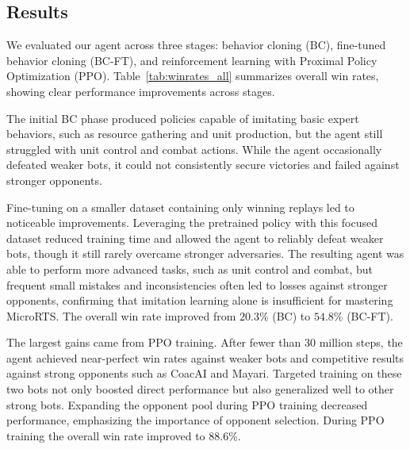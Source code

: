\documentclass[10pt,twocolumn,letterpaper]{article}
\begin{document}
\subsection{Results}

We evaluated our agent across three stages: behavior cloning (BC), fine-tuned behavior cloning (BC-FT), and reinforcement learning with Proximal Policy Optimization (PPO). Table~\ref{tab:winrates_all} summarizes overall win rates, showing clear performance improvements across stages.

The initial BC phase produced policies capable of imitating basic expert behaviors, such as resource gathering and unit production, but the agent still struggled with unit control and combat actions. While the agent occasionally defeated weaker bots, it could not consistently secure victories and failed against stronger opponents. 

Fine-tuning on a smaller dataset containing only winning replays led to noticeable improvements. Leveraging the pretrained policy with this focused dataset reduced training time and allowed the agent to reliably defeat weaker bots, though it still rarely overcame stronger adversaries. The resulting agent was able to perform more advanced tasks, such as unit control and combat, but frequent small mistakes and inconsistencies often led to losses against stronger opponents, confirming that imitation learning alone is insufficient for mastering MicroRTS. The overall win rate improved from $20.3\%$ (BC)  to $54.8\%$ (BC-FT).

The largest gains came from PPO training. After fewer than 30 million steps, the agent achieved near-perfect win rates against weaker bots and competitive results against strong opponents such as CoacAI and Mayari. Targeted training on these two bots not only boosted direct performance but also generalized well to other strong bots. Expanding the opponent pool during PPO training decreased performance, emphasizing the importance of opponent selection. During PPO training the overall win rate improved to $88.6\%$. 
\end{document}
